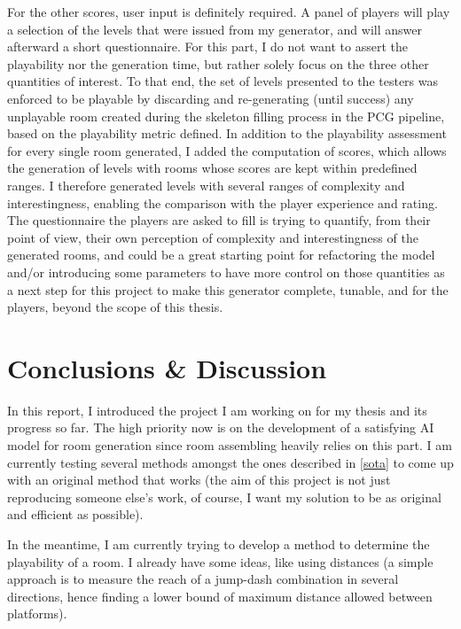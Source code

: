 \documentclass{article}
\begin{document}
\noindent For the other scores, user input is definitely required. A panel of players will play a selection of the levels that were issued from my generator, and will answer afterward a short questionnaire. For this part, I do not want to assert the playability nor the generation time, but rather solely focus on the three other quantities of interest. To that end, the set of levels presented to the testers was enforced to be playable by discarding and re-generating (until success) any unplayable room created during the skeleton filling process in the PCG pipeline, based on the playability metric defined. In addition to the playability assessment for every single room generated, I added the computation of scores, which allows the generation of levels with rooms whose scores are kept within predefined ranges. I therefore generated levels with several ranges of complexity and interestingness, enabling the comparison with the player experience and rating. The questionnaire the players are asked to fill is trying to quantify, from their point of view, their own perception of complexity and interestingness of the generated rooms, and could be a great starting point for refactoring the model and/or introducing some parameters to have more control on those quantities as a next step for this project to make this generator complete, tunable, and for the players, beyond the scope of this thesis.


\section{Conclusions \& Discussion}

In this report, I introduced the project I am working on for my thesis and its progress so far. The high priority now is on the development of a satisfying AI model for room generation since room assembling heavily relies on this part. I am currently testing several methods amongst the ones described in \ref{sota} to come up with an original method that works (the aim of this project is not just reproducing someone else's work, of course, I want my solution to be as original and efficient as possible).

\noindent In the meantime, I am currently trying to develop a method to determine the playability of a room. I already have some ideas, like using distances (a simple approach is to measure the reach of a jump-dash combination in several directions, hence finding a lower bound of maximum distance allowed between platforms).



\end{document}
